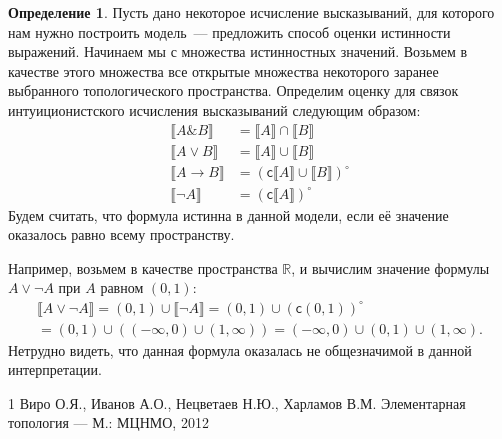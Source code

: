 \documentclass[a4paper,11pt]{article}
\theoremstyle{definition}
\newtheorem{dfn}[thm]{Определение}
\newcommand{\cmpl}{\mathsf{c}}
\begin{document}
\begin{dfn}
Пусть дано некоторое исчисление высказываний, для которого нам нужно построить
модель~--- предложить способ оценки истинности выражений. Начинаем мы с
множества истинностных значений. Возьмем в качестве этого множества все
открытые множества некоторого заранее выбранного топологического пространства.
Определим оценку для связок интуиционистского исчисления высказываний следующим
образом:
\begin{align*}
\llbracket A\mathbin{\&}B\rrbracket &= \llbracket A\rrbracket \cap \llbracket B\rrbracket\\
\llbracket A \vee B\rrbracket &= \llbracket A\rrbracket \cup \llbracket B\rrbracket\\
\llbracket A \to B\rrbracket &= (\cmpl\llbracket A\rrbracket \cup \llbracket B\rrbracket)^\circ\\
\llbracket \neg A\rrbracket &= (\cmpl\llbracket A\rrbracket)^\circ
\end{align*}
Будем считать, что формула истинна в данной модели, если её значение оказалось
равно всему пространству.
\end{dfn}

Например, возьмем в качестве пространства $\mathbb{R}$, и вычислим значение
формулы $A \vee \neg A$ при $A$ равном $(0, 1)$:
\begin{multline*}
\llbracket A\vee\neg A\rrbracket = (0,1)\cup\llbracket\neg A\rrbracket = (0,1)\cup(\cmpl(0,1))^\circ\\
= (0,1)\cup((-\infty,0)\cup(1,\infty)) = (-\infty,0)\cup(0,1)\cup(1,\infty).
\end{multline*}
Нетрудно видеть, что данная формула оказалась не общезначимой в данной
интерпретации.

\begin{thebibliography}{1}
 Виро О.Я., Иванов А.О., Нецветаев Н.Ю., Харламов В.М.
  Элементарная топология --- М.: МЦНМО, 2012
\end{thebibliography}
\end{document}
